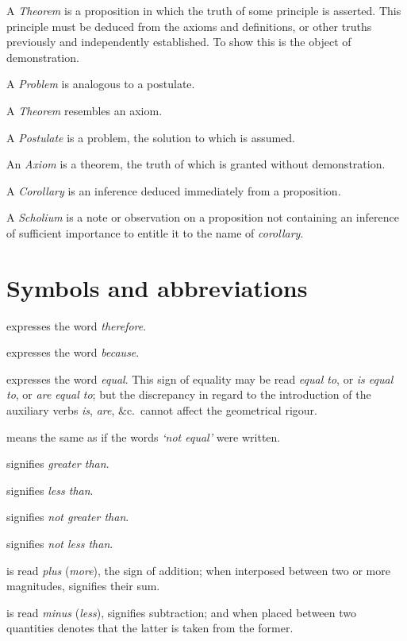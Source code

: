 \documentclass[booklanguage=english]{byrnebook}
\begin{document}
A \emph{Theorem} is a proposition in which the truth of some principle is asserted. This principle must be deduced from the axioms and definitions, or other truths previously and independently established. To show this is the object of demonstration.

A \emph{Problem} is analogous to a postulate.

A \emph{Theorem} resembles an axiom.

A \emph{Postulate} is a problem, the solution to which is assumed.

An \emph{Axiom} is a theorem, the truth of which is granted without demonstration.

A \emph{Corollary} is an inference deduced immediately from a proposition.

A \emph{Scholium} is a note or observation on a proposition not containing an inference of sufficient importance to entitle it to the name of \emph{corollary}.


\chapter*{Symbols and abbreviations}

\symb{$\therefore$}
expresses the word \emph{therefore}.

\symb{$\because$}
 expresses the word \emph{because}.

\symb{$=$}
 expresses the word \emph{equal}. This sign of equality may be read \emph{equal to}, or \emph{is equal to}, or \emph{are equal to}; but the discrepancy in regard to the introduction of the auxiliary verbs \emph{is}, \emph{are}, \&c.\ cannot affect the geometrical rigour.

\symb{$\neq$}
 means the same as if the words \emph{‘not equal’} were written.

\symb{$>$}
 signifies \emph{greater than}.

\symb{$<$}
 signifies \emph{less than}.

\symb{$\ngtr$}
 signifies \emph{not greater than}.

\symb{$\nless$}
 signifies \emph{not less than}.

\symb{$+$}
 is read \emph{plus} (\emph{more}), the sign of addition; when interposed between two or more magnitudes, signifies their sum.

\symb{$-$}
 is read \emph{minus} (\emph{less}), signifies subtraction; and when placed between two quantities denotes that the latter is taken from the former.
\end{document}
